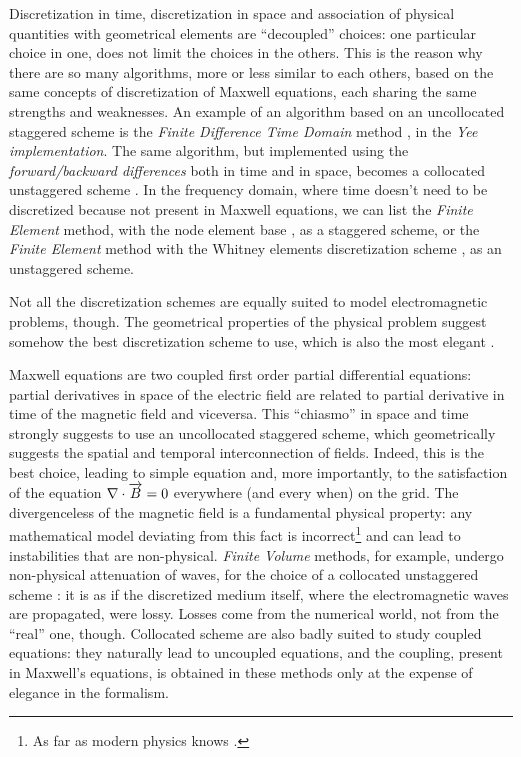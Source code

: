 Discretization in time, discretization in space and association of
physical quantities with geometrical elements are ``decoupled''
choices: one particular choice in one, does not limit the choices in
the others. This is the reason why there are so many algorithms, more
or less similar to each others, based on the same concepts of
discretization of Maxwell equations, each sharing the same strengths
and weaknesses. An example of an algorithm based on an uncollocated
staggered scheme is the \emph{Finite Difference Time Domain} method
\cite{taflove_computational}, in the \emph{Yee
implementation}\cite{yee_numerical}. The same algorithm, but
implemented using the \emph{forward/backward differences} both in time
and in space, becomes a collocated unstaggered scheme
\cite{lavrinenko_comprehensive}. In the frequency domain, where time
doesn't need to be discretized because not present in Maxwell
equations, we can list the \emph{Finite Element} method, with the node
element base \cite{jin_finite}, as a staggered scheme, or the
\emph{Finite Element} method with the Whitney elements discretization
scheme \cite{bossavit_yee}, as an unstaggered scheme.

Not all the discretization schemes are equally suited to model
electromagnetic problems, though. The geometrical properties of the
physical problem suggest somehow the best discretization scheme to
use, which is also the most elegant \cite{maxwell_mathematical}.

Maxwell equations are two coupled first order partial differential
equations: partial derivatives in space of the electric field are
related to partial derivative in time of the magnetic field and
viceversa. This ``chiasmo'' in space and time strongly suggests to use
an uncollocated staggered scheme, which geometrically suggests the
spatial and temporal interconnection of fields. Indeed, this is the
best choice, leading to simple equation and, more importantly, to the
satisfaction of the equation ${\nabla \cdot \overrightarrow{B}} = 0$ everywhere (and every
when) on the grid. The divergenceless of the magnetic field is a
fundamental physical property: any mathematical model deviating from
this fact is incorrect\footnote{As far as modern physics knows
\cite{mead_collective}.} and can lead to instabilities that are
non-physical. \emph{Finite Volume} methods, for example, undergo
non-physical attenuation of waves, for the choice of a collocated
unstaggered scheme \cite{taflove_advances}: it is as if the
discretized medium itself, where the electromagnetic waves are
propagated, were lossy. Losses come from the numerical world, not from
the ``real'' one, though. Collocated scheme are also badly suited to
study coupled equations: they naturally lead to uncoupled equations,
and the coupling, present in Maxwell's equations, is obtained in these
methods only at the expense of elegance in the formalism.

